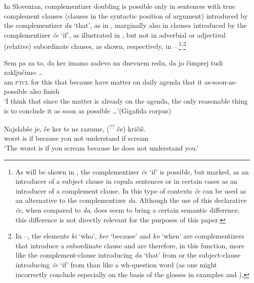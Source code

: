 \documentclass[output=paper,
]{langscibook}
\begin{document}
In Slovenian, complementizer doubling is possible only in sentences with true complement clauses (clauses in the syntactic position of argument) introduced by the complementizer \textit{da} `that', as in , marginally also in clauses introduced by the complementizer \textit{če} `if', as illustrated in , but not in adverbial or adjectival (relative) subordinate clauses, as shown, respectively, in --.\footnote{As will be shown in , the complementizer \textit{če} `if' is possible, but marked, as an introducer of a subject clause in copula sentences or in certain cases as an introducer of a complement clause. In this type of contexts \textit{če} can be used as an alternative to the complementizer \textit{da}. Although the use of this declarative \textit{če}, when compared to \textit{da}, does seem to bring a certain semantic difference, this difference is not directly relevant for the purposes of this paper.}\textsuperscript{,}\footnote{In --, the elements \textit{ki} `who', \textit{ker} `because' and \textit{ko} `when' are complementizers that introduce a subordinate clause and are therefore, in this function, more like the complement-clause introducing \textit{da} `that' from  or the subject-clause introducing \textit{če} `if' from  than like a wh-question word (as one might incorrectly conclude especially on the basis of the glosses in examples  and ).}

\begin{exe} 
\ex \label{ex:plesnicar:nine}
\gll  Sem	pa	za	to,	da	ker		imamo	zadevo	na dnevnem	redu,	da	jo	čimprej	tudi	zaključimo {\ldots}\\
 am	\textsc{ptcl}	for	this	that	because	have	matter	on daily		agenda	that	it	as-soon-as-possible		also	finish	\\
\trans `I think that since the matter is already on the agenda, the only reasonable thing is to conclude it as soon as possible {\ldots}'\hfill (Gigafida corpus) 
\end{exe}

\begin{exe} 
\ex \label{ex:plesnicar:ten}
\gll Najslabše 	je,	če	ker		te	ne	razume,	(\textsuperscript{??}\hspace{-2pt} če) kričiš. \\
	worst		is	if	because	you	not	understand	{} if scream\\
\trans `The worst is if you scream because he does not understand you.' 
\end{exe}
\end{document}
